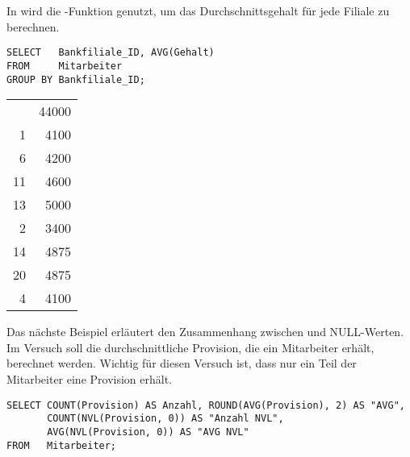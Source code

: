         In  wird die -Funktion genutzt, um das Durchschnittsgehalt f\"ur jede Filiale zu berechnen.
        \begin{lstlisting}[language=oracle_sql,caption={Die AVG-Funktion},label=sql05_08]
SELECT   Bankfiliale_ID, AVG(Gehalt)
FROM     Mitarbeiter
GROUP BY Bankfiliale_ID;
        \end{lstlisting}
\clearpage
        \begin{center}
          \begin{small}
            \tablehead{}
            \begin{msoraclesql}
              \begin{supertabular}{rr}
                & 44000 \\
                1 & 4100 \\
                6 & 4200 \\
                11 & 4600 \\
                13 & 5000 \\
                2 & 3400 \\
                14 & 4875 \\
                20 & 4875 \\
                4 & 4100 \\
              \end{supertabular}
            \end{msoraclesql}
          \end{small}
        \end{center}
        Das n\"achste Beispiel erl\"autert den Zusammenhang zwischen  und NULL-Werten. Im Versuch soll die durchschnittliche Provision, die ein Mitarbeiter erh\"alt, berechnet werden. Wichtig f\"ur diesen Versuch ist, dass nur ein Teil der Mitarbeiter eine Provision erh\"alt.
        \begin{lstlisting}[language=oracle_sql,caption={AVG und NULL-Werte in Oracle},label=sql05_09]
SELECT COUNT(Provision) AS Anzahl, ROUND(AVG(Provision), 2) AS "AVG",
       COUNT(NVL(Provision, 0)) AS "Anzahl NVL",
       AVG(NVL(Provision, 0)) AS "AVG NVL"
FROM   Mitarbeiter;
        \end{lstlisting}
